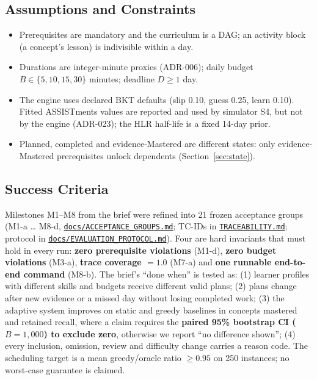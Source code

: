 \documentclass[english]{sintr}
\newcommand{\repourl}{https://github.com/Bhuvan-56/adaptive-learning-path-planner-DAT}
\newcommand{\sha}{cs5903-final-2026}
\DeclareRobustCommand{\rf}[1]{\href{\repourl/blob/\sha/#1}{\nolinkurl{#1}}}
\begin{document}
\subsection{Assumptions and Constraints}
\begin{itemize}
    \item Prerequisites are mandatory and the curriculum is a DAG; an activity block (a concept's lesson) is indivisible within a day.
    \item Durations are integer-minute proxies (ADR-006); daily budget $B \in \{5, 10, 15, 30\}$ minutes; deadline $D \geq 1$ day.
    \item The engine uses declared BKT defaults (slip 0.10, guess 0.25, learn 0.10). Fitted ASSISTments values are reported and used by simulator S4, but not by the engine (ADR-023); the HLR half-life is a fixed 14-day prior.
    \item Planned, completed and evidence-Mastered are different states: only evidence-Mastered prerequisites unlock dependents (Section~\ref{sec:state}).
\end{itemize}

\subsection{Success Criteria}
Milestones M1--M8 from the brief were refined into 21 frozen acceptance groups (M1-a \ldots{} M8-d, \rf{docs/ACCEPTANCE_GROUPS.md}; TC-IDs in \rf{TRACEABILITY.md}; protocol in \rf{docs/EVALUATION_PROTOCOL.md}). Four are hard invariants that must hold in every run: \textbf{zero prerequisite violations} (M1-d), \textbf{zero budget violations} (M3-a), \textbf{trace coverage $=1.0$} (M7-a) and \textbf{one runnable end-to-end command} (M8-b).
\vspace{0.2em}\newline
The brief's ``done when'' is tested as: (1) learner profiles with different skills and budgets receive different valid plans; (2) plans change after new evidence or a missed day without losing completed work; (3) the adaptive system improves on static and greedy baselines in concepts mastered and retained recall, where a claim requires the \textbf{paired 95\% bootstrap CI ($B=1{,}000$) to exclude zero}, otherwise we report ``no difference shown''; (4) every inclusion, omission, review and difficulty change carries a reason code. The scheduling target is a mean greedy/oracle ratio $\geq 0.95$ on 250 instances; no worst-case guarantee is claimed.

\end{document}
